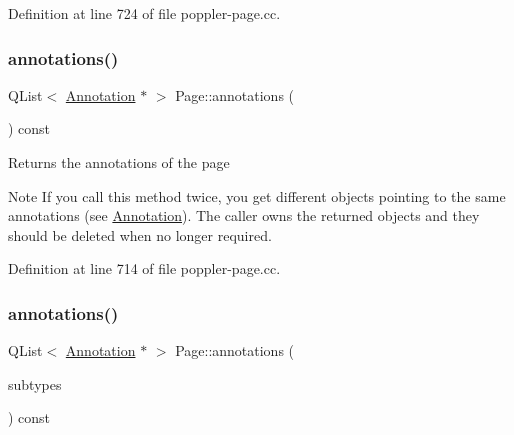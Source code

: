 Definition at line 724 of file poppler-\/page.\+cc.

\mbox{\label{class_poppler_1_1_page_a74edabc4ccb349b5227cec4810aed310}} 
\subsubsection{\texorpdfstring{annotations()}{annotations()}\hspace{0.1cm}{\footnotesize\ttfamily [1/2]}}
{\footnotesize\ttfamily Q\+List$<$ \hyperlink{class_poppler_1_1_annotation}{Annotation} $\ast$ $>$ Page\+::annotations (\begin{DoxyParamCaption}{ }\end{DoxyParamCaption}) const}

Returns the annotations of the page

\begin{DoxyNote}{Note}
If you call this method twice, you get different objects pointing to the same annotations (see \hyperlink{class_poppler_1_1_annotation}{Annotation}). The caller owns the returned objects and they should be deleted when no longer required. 
\end{DoxyNote}


Definition at line 714 of file poppler-\/page.\+cc.

\mbox{\label{class_poppler_1_1_page_a46f2df75edea8d9fb0c59573304e1b99}} 
\subsubsection{\texorpdfstring{annotations()}{annotations()}\hspace{0.1cm}{\footnotesize\ttfamily [2/2]}}
{\footnotesize\ttfamily Q\+List$<$ \hyperlink{class_poppler_1_1_annotation}{Annotation} $\ast$ $>$ Page\+::annotations (\begin{DoxyParamCaption}\item[{const Q\+Set$<$ \hyperlink{class_poppler_1_1_annotation_a2d592999c330949d64679cfa9e81113f}{Annotation\+::\+Sub\+Type} $>$ \&}]{subtypes }\end{DoxyParamCaption}) const}

